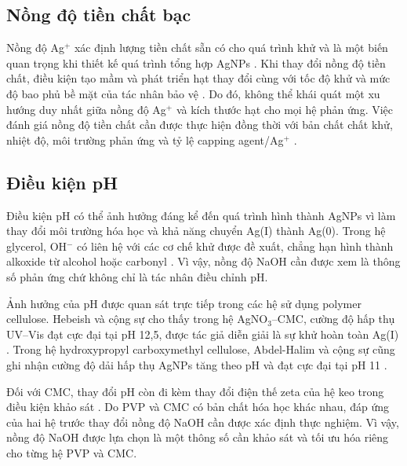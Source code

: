 \subsection{Nồng độ tiền chất bạc}
Nồng độ Ag$^+$ xác định lượng tiền chất sẵn có cho quá trình khử và là một biến quan trọng khi thiết kế quá trình tổng hợp AgNPs \parencite{sun2013,zhang2016}.
Khi thay đổi nồng độ tiền chất, điều kiện tạo mầm và phát triển hạt thay đổi cùng với tốc độ khử và mức độ bao phủ bề mặt của tác nhân bảo vệ \parencite{jun2022,sun2013,restrepo2021}.
Do đó, không thể khái quát một xu hướng duy nhất giữa nồng độ Ag$^+$ và kích thước hạt cho mọi hệ phản ứng.
Việc đánh giá nồng độ tiền chất cần được thực hiện đồng thời với bản chất chất khử, nhiệt độ, môi trường phản ứng và tỷ lệ capping agent/Ag$^+$ \parencite{sun2013,restrepo2021}.
\subsection{Điều kiện pH}
Điều kiện pH có thể ảnh hưởng đáng kể đến quá trình hình thành AgNPs vì làm thay đổi môi trường hóa học và khả năng chuyển Ag(I) thành Ag(0).
Trong hệ glycerol, OH$^-$ có liên hệ với các cơ chế khử được đề xuất, chẳng hạn hình thành alkoxide từ alcohol hoặc carbonyl \parencite{liu2020glycerol}.
Vì vậy, nồng độ NaOH cần được xem là thông số phản ứng chứ không chỉ là tác nhân điều chỉnh pH.
\par
Ảnh hưởng của pH được quan sát trực tiếp trong các hệ sử dụng polymer cellulose.
Hebeish và cộng sự cho thấy trong hệ AgNO$_3$--CMC, cường độ hấp thụ UV--Vis đạt cực đại tại pH 12,5, được tác giả diễn giải là sự khử hoàn toàn Ag(I) \parencite{hebeish2010}.
Trong hệ hydroxypropyl carboxymethyl cellulose, Abdel-Halim và cộng sự cũng ghi nhận cường độ dải hấp thụ AgNPs tăng theo pH và đạt cực đại tại pH 11 \parencite{abdelhalim2015}.
\par
Đối với CMC, thay đổi pH còn đi kèm thay đổi điện thế zeta của hệ keo trong điều kiện khảo sát \parencite{magdassi2003}.
Do PVP và CMC có bản chất hóa học khác nhau, đáp ứng của hai hệ trước thay đổi nồng độ NaOH cần được xác định thực nghiệm.
Vì vậy, nồng độ NaOH được lựa chọn là một thông số cần khảo sát và tối ưu hóa riêng cho từng hệ PVP và CMC.
